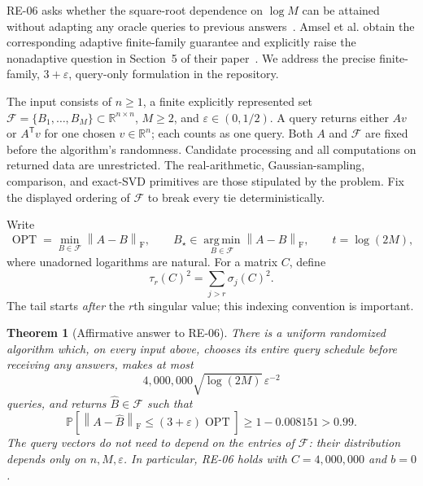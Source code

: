 \documentclass[11pt]{article}
\numberwithin{equation}{section}
\newtheorem{theorem}{Theorem}[section]
\theoremstyle{remark}
\newcommand{\R}{\mathbb R}
\newcommand{\Prob}{\mathbb P}
\newcommand{\F}{\mathcal F}
\newcommand{\OPT}{\operatorname{OPT}}
\newcommand{\norm}[1]{\left\lVert #1\right\rVert_{\mathrm F}}
\newcommand{\argmin}{\operatorname*{arg\,min}}
\newcommand{\T}{\mathsf T}
\begin{document}
RE-06 asks whether the square-root dependence on $\log M$ can be attained without adapting any oracle queries to previous answers~\cite{re06}.
Amsel et al. obtain the corresponding adaptive finite-family guarantee and explicitly raise the nonadaptive question in Section~5 of their paper~\cite{amsel}.
We address the precise finite-family, $3+\varepsilon$, query-only formulation in the repository.

The input consists of $n\ge1$, a finite explicitly represented set
$\F=\{B_1,\ldots,B_M\}\subset\R^{n\times n}$, $M\ge2$, and
$\varepsilon\in(0,1/2)$. A query returns either $Av$ or $A^\T v$ for one chosen $v\in\R^n$; each counts as one query. Both $A$ and $\F$ are fixed before the algorithm's randomness. Candidate processing and all computations on returned data are unrestricted. The real-arithmetic, Gaussian-sampling, comparison, and exact-SVD primitives are those stipulated by the problem. Fix the displayed ordering of $\F$ to break every tie deterministically.

Write
\[
 \OPT=\min_{B\in\F}\norm{A-B},\qquad
 B_\star\in\argmin_{B\in\F}\norm{A-B},\qquad
 t=\log(2M),
\]
where unadorned logarithms are natural. For a matrix $C$, define
\begin{equation}\label{eq:taildef}
 \tau_r(C)^2=\sum_{j>r}\sigma_j(C)^2.
\end{equation}
The tail starts \emph{after} the $r$th singular value; this indexing convention is important.

\begin{theorem}[Affirmative answer to RE-06]\label{thm:main}
There is a uniform randomized algorithm which, on every input above, chooses its entire query schedule before receiving any answers, makes at most
\begin{equation}\label{eq:maincount}
 4{,}000{,}000\sqrt{\log(2M)}\,\varepsilon^{-2}
\end{equation}
queries, and returns $\widehat B\in\F$ such that
\begin{equation}\label{eq:maingoal}
 \Prob\!\left[\norm{A-\widehat B}\le(3+\varepsilon)\OPT\right]
 \ge 1-0.008151>0.99.
\end{equation}
The query vectors do not need to depend on the entries of $\F$: their distribution depends only on $n,M,\varepsilon$. In particular, RE-06 holds with $C=4{,}000{,}000$ and $b=0$.
\end{theorem}
\end{document}
